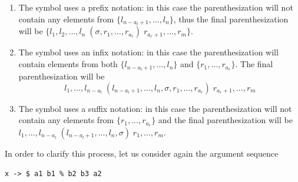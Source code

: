 \begin{enumerate}
	\item The symbol uses a prefix notation: in this case the parenthesization will not contain any elements from $\lbrace l_{n - a_l + 1}, ..., l_{n} \rbrace$, thus the final parenthesization will be $\lbrace l_1, l_2, ..., l_n \; (\sigma, r_1, ..., r_{a_r}) \; r_{a_r + 1}, ..., r_{m} \rbrace$.
	\item The symbol uses an infix notation: in this case the parenthesization will contain elements from both $\lbrace l_{n - a_l + 1}, ..., l_{n} \rbrace$ and $\lbrace r_1, ..., r_{a_r} \rbrace$. The final parenthesization will be $$l_1, ...,l_{n - a_l} \; (l_{n - a_l + 1}, ..., l_{n},\sigma, r_1, ..., r_{a_r}) \; r_{a_r + 1} ,..., r_{m}$$
	\item The symbol uses a suffix notation: in this case the parenthesization will not contain any elements from $\lbrace r_1, ..., r_{a_r} \rbrace$ and the final parenthesization will be $l_1,...,l_{n - a_l} \; (l_{n - a_l + 1}, ..., l_{n},\sigma) \; r_{1},...,r_{m}$.
\end{enumerate}

In order to clarify this process, let us consider again the argument sequence

\begin{lstlisting}
x -> $ a1 b1 % b2 b3 a2
\end{lstlisting}

